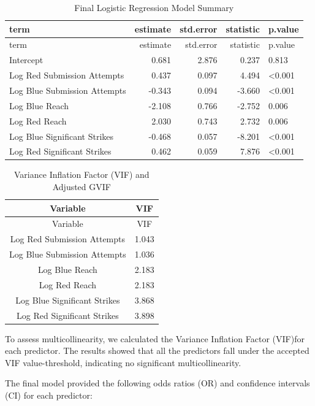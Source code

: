 \documentclass[
  letterpaper,
  DIV=11,
  numbers=noendperiod]{scrartcl}
\begin{document}
\begin{longtable}[]{@{}lrrrl@{}}
\caption{Final Logistic Regression Model Summary}\tabularnewline
\toprule\noalign{}
term & estimate & std.error & statistic & p.value \\
\midrule\noalign{}
\endfirsthead
\toprule\noalign{}
term & estimate & std.error & statistic & p.value \\
\midrule\noalign{}
\endhead
\bottomrule\noalign{}
\endlastfoot
Intercept & 0.681 & 2.876 & 0.237 & 0.813 \\
Log Red Submission Attempts & 0.437 & 0.097 & 4.494 & \textless0.001 \\
Log Blue Submission Attempts & -0.343 & 0.094 & -3.660 &
\textless0.001 \\
Log Blue Reach & -2.108 & 0.766 & -2.752 & 0.006 \\
Log Red Reach & 2.030 & 0.743 & 2.732 & 0.006 \\
Log Blue Significant Strikes & -0.468 & 0.057 & -8.201 &
\textless0.001 \\
Log Red Significant Strikes & 0.462 & 0.059 & 7.876 & \textless0.001 \\
\end{longtable}

\begin{longtable}[]{@{}cc@{}}
\caption{Variance Inflation Factor (VIF) and Adjusted
GVIF}\tabularnewline
\toprule\noalign{}
Variable & VIF \\
\midrule\noalign{}
\endfirsthead
\toprule\noalign{}
Variable & VIF \\
\midrule\noalign{}
\endhead
\bottomrule\noalign{}
\endlastfoot
Log Red Submission Attempts & 1.043 \\
Log Blue Submission Attempts & 1.036 \\
Log Blue Reach & 2.183 \\
Log Red Reach & 2.183 \\
Log Blue Significant Strikes & 3.868 \\
Log Red Significant Strikes & 3.898 \\
\end{longtable}

To assess multicollinearity, we calculated the Variance Inflation Factor
(VIF)for each predictor. The results showed that all the predictors fall
under the accepted VIF value-threshold, indicating no significant
multicollinearity.

The final model provided the following odds ratios (OR) and confidence
intervals (CI) for each predictor:
\end{document}
